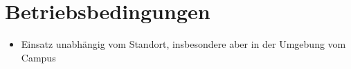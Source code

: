 \section{Betriebsbedingungen}

\begin{itemize}
	\item Einsatz unabhängig vom Standort, insbesondere aber in der Umgebung vom \Gls{Campus}
\end{itemize}